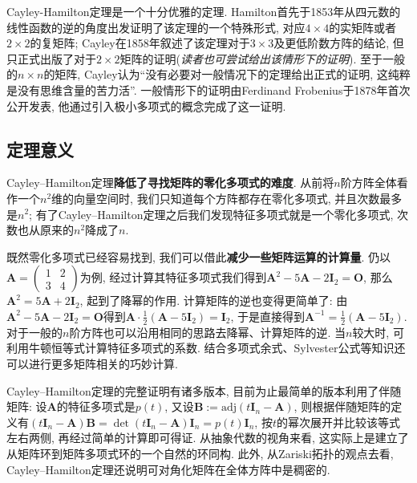 \documentclass[main]{subfiles}
\newcommand{\dis}{\displaystyle}
\newcommand{\adj}{\mathrm{adj}}
\begin{document}
		Cayley-Hamilton定理是一个十分优雅的定理. Hamilton首先于1853年从四元数的线性函数的逆的角度出发证明了该定理的一个特殊形式, 对应$4\times 4$的实矩阵或者$2\times 2$的复矩阵; Cayley在1858年叙述了该定理对于$3\times 3$及更低阶数方阵的结论, 但只正式出版了对于$2\times 2$矩阵的证明(\textit{读者也可尝试给出该情形下的证明}). 至于一般的$n\times n$的矩阵, Cayley认为“没有必要对一般情况下的定理给出正式的证明, 这纯粹是没有思维含量的苦力活”. 一般情形下的证明由Ferdinand Frobenius于1878年首次公开发表, 他通过引入极小多项式的概念完成了这一证明.
		
	\subsection*{定理意义}
		Cayley–Hamilton定理\textbf{降低了寻找矩阵的零化多项式的难度}. 从前将$n$阶方阵全体看作一个$n^{2}$维的向量空间时, 我们只知道每个方阵都存在零化多项式, 并且次数最多是$n^2$; 有了Cayley–Hamilton定理之后我们发现特征多项式就是一个零化多项式, 次数也从原来的$n^2$降成了$n$. 
	
		既然零化多项式已经容易找到, 我们可以借此\textbf{减少一些矩阵运算的计算量}. 仍以$\boldsymbol{A}=\begin{pmatrix}
			1 & 2 \\
			3 & 4
		\end{pmatrix}$为例, 经过计算其特征多项式我们得到$\boldsymbol{A}^2-5\boldsymbol{A}-2\boldsymbol{I}_2=\boldsymbol{O}$, 那么$\boldsymbol{A}^2=5\boldsymbol{A}+2\boldsymbol{I}_2$, 起到了降幂的作用. 计算矩阵的逆也变得更简单了: 由$\boldsymbol{A}^2-5\boldsymbol{A}-2\boldsymbol{I}_2=\boldsymbol{O}$得到$\dis\boldsymbol{A}\cdot\frac{1}{2}(\boldsymbol{A}-5\boldsymbol{I}_2)=\boldsymbol{I}_2$, 于是直接得到$\dis\boldsymbol{A}^{-1}=\frac{1}{2}(\boldsymbol{A}-5\boldsymbol{I}_2)$. 对于一般的$n$阶方阵也可以沿用相同的思路去降幂、计算矩阵的逆. 当$n$较大时, 可利用牛顿恒等式计算特征多项式的系数. 结合多项式余式、Sylvester公式等知识还可以进行更多矩阵相关的巧妙计算. 
		
		Cayley–Hamilton定理的完整证明有诸多版本, 目前为止最简单的版本利用了伴随矩阵: 设$\boldsymbol{A}$的特征多项式是$p(t)$, 又设$\boldsymbol{B}:=\adj(t\boldsymbol{I}_n-\boldsymbol{A})$, 则根据伴随矩阵的定义有$(t\boldsymbol{I}_n-\boldsymbol{A})\boldsymbol{B}=\det(t\boldsymbol{I}_n-\boldsymbol{A})\boldsymbol{I}_n=p(t)\boldsymbol{I}_n$, 按$t$的幂次展开并比较该等式左右两侧, 再经过简单的计算即可得证. 从抽象代数的视角来看, 这实际上是建立了从矩阵环到矩阵多项式环的一个自然的环同构. 此外, 从Zariski拓扑的观点去看, Cayley–Hamilton定理还说明可对角化矩阵在全体方阵中是稠密的.
\end{document}
